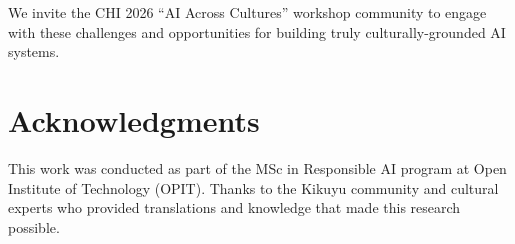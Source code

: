 \documentclass[11pt,twocolumn]{article}
\begin{document}
We invite the CHI 2026 ``AI Across Cultures'' workshop community to engage with these challenges and opportunities for building truly culturally-grounded AI systems.

\section*{Acknowledgments}

This work was conducted as part of the MSc in Responsible AI program at Open Institute of Technology (OPIT). Thanks to the Kikuyu community and cultural experts who provided translations and knowledge that made this research possible.



\end{document}
